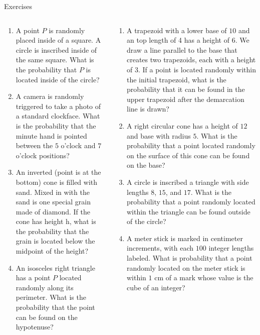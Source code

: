 \documentclass[9pt,aspectratio=169]{beamer}
\begin{document}
\begin{frame}{Exercises}
  \begin{columns}[T]
    \begin{column}{0.5\textwidth}
      \begin{enumerate}
        \item A point $P$ is randomly placed inside of a square.  A circle is inscribed inside of the same square.  What is the probability that $P$ is located inside of the circle? 
        \item A camera is randomly triggered to take a photo of a standard clockface.  What is the probability that the minute hand is pointed between the $5$ o’clock and $7$ o’clock positions?
        \item An inverted (point is at the bottom) cone is filled with sand.  Mixed in with the sand is one special grain made of diamond. If the cone has height h, what is the probability that the grain is located below the midpoint of the height?
        \item An isosceles right triangle has a point $P$ located randomly along its perimeter.  What is the probability that the point can be found on the hypotenuse?
        \seti
      \end{enumerate}
    \end{column}
    \begin{column}{0.5\textwidth}
      \vspace*{-2.6em}
      \begin{enumerate}
        \conti
        \item A trapezoid with a lower base of $10$ and an top length of 4 has a height of 6.  We draw a line parallel to the base that creates two trapezoids, each with a height of 3.  If a point is located randomly within the initial trapezoid, what is the probability that it can be found in the upper trapezoid after the demarcation line is drawn?
        \item A right circular cone has a height of $12$ and base with radius $5$.  What is the probability that a point located randomly on the surface of this cone can be found on the base?
        \item A circle is inscribed a triangle with side lengths $8$, $15$, and $17$.  What is the probability that a point randomly located within the triangle can be found outside of the circle?
        \item A meter stick is marked in centimeter increments, with each $100$ integer lengths labeled.  What is probability that a point randomly located on the meter stick is within $1$ cm of a mark whose value is the cube of an integer?        
      \end{enumerate}
    \end{column}
  \end{columns}
\end{frame}
\end{document}
